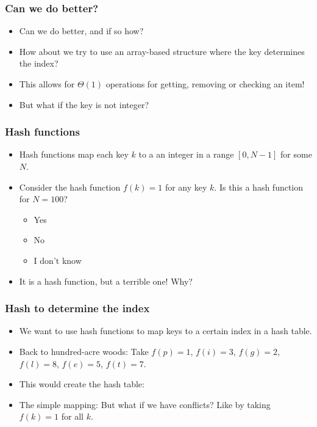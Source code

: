 \begin{frame}
	\frametitle{Can we do better?}
		\begin{itemize}
			\item Can we do better, and if so how?
			\item How about we try to use an array-based structure where the key determines the index?
			\item This allows for $\Theta(1)$ operations for getting, removing or checking an item!
			\item But what if the key is not integer?
	\end{itemize}
\end{frame}

\begin{frame}
	\frametitle{Hash functions}
	
		\begin{itemize}
			\item Hash functions map each key $k$ to a an integer in a range $[0, N-1]$ for some $N$.
			\item Consider the hash function $f(k) = 1$ for any key $k$.
			Is this a hash function for $N=100$?
			\begin{itemize}
				\item Yes
				\item No
				\item I don't know
			\end{itemize}
			\item It is a hash function, but a terrible one!
				Why?
		\end{itemize}	
\end{frame}

\begin{frame}
	\frametitle{Hash to determine the index}

		\begin{itemize}
			\item We want to use hash functions to map keys to a certain index in a hash table.
			\item Back to hundred-acre woods:
		Take $f(p) = 1$, $f(i) = 3$, $f(g) = 2$, $f(l) = 8$, $f(e) = 5$, $f(t) = 7$.
		
			\item This would create the hash table:
		\begin{center}
			
		\end{center}
\item The simple mapping:
		But what if we have conflicts? Like by taking $f(k)=1$ for all $k$.
	\end{itemize}	
\end{frame}

